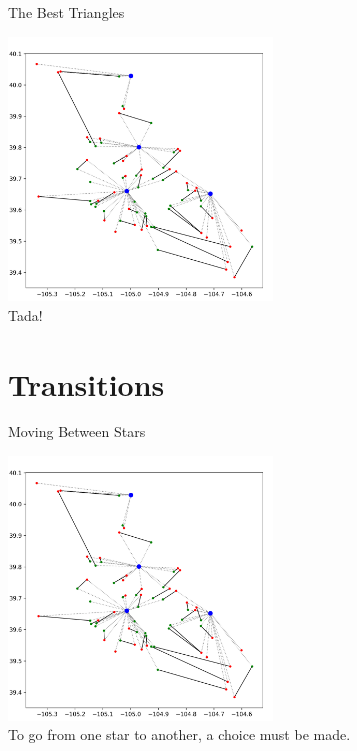 \documentclass{beamer}
\begin{document}
\begin{frame}{The Best Triangles}
	\begin{center}
	\includegraphics[width=7cm]{triangles.png}\\
	Tada!
	\end{center}
\end{frame}

\section{Transitions}
\begin{frame}{Moving Between Stars}
	\begin{center}
	\includegraphics[width=7cm]{triangles.png}\\
	To go from one star to another, a choice must be made.
	\end{center}
\end{frame}
\end{document}
